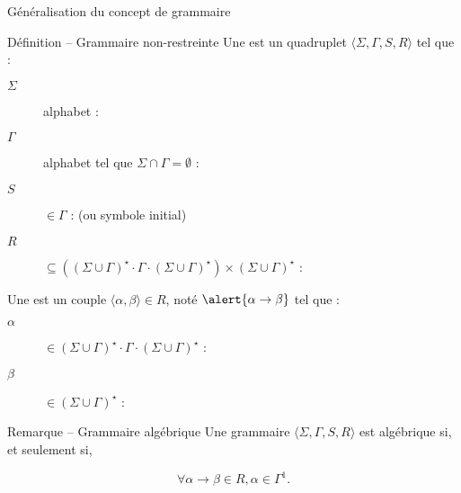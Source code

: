 
\begingroup


\begin{frame}{Généralisation du concept de grammaire}
  \begin{block}{Définition -- Grammaire non-restreinte}
    \vspace{2mm}
    Une  est un quadruplet \alert{$\langle \Sigma, \Gamma, S, R \rangle$} tel que :
    \begin{description}
    \item[\alert{$\Sigma$}] alphabet : 
    \item[\alert{$\Gamma$}] alphabet tel que $\Sigma \cap \Gamma = \emptyset$ : 
    \item[\alert{$S$}] $\in \Gamma$ :  (ou symbole initial)
    \item[\alert{$R$}] $\subseteq ((\Sigma \cup \Gamma)^\star \cdot \Gamma \cdot (\Sigma \cup \Gamma)^\star) \times (\Sigma \cup \Gamma)^\star$ : \\
    \end{description}

    \vspace{3mm}
    Une  est un couple \alert{$\langle \alpha, \beta \rangle \in R$}, noté $\alert{\alpha \rightarrow \beta}$ tel que :
    \begin{description}
    \item[\alert{$\alpha$}] $\in (\Sigma \cup \Gamma)^\star \cdot \Gamma \cdot (\Sigma \cup \Gamma)^\star$ : 
    \item[\alert{$\beta$}] $\in (\Sigma \cup \Gamma)^\star$ : 
    \end{description}
  \end{block}
  \begin{block}{Remarque -- Grammaire algébrique}
    Une grammaire $\langle \Sigma, \Gamma, S, R \rangle$ est algébrique si, et seulement si,
    
    \vspace{-3mm}  $$\forall \alpha \rightarrow \beta \in R, \alpha \in \Gamma^1.$$
  \end{block}
\end{frame}

\endgroup

